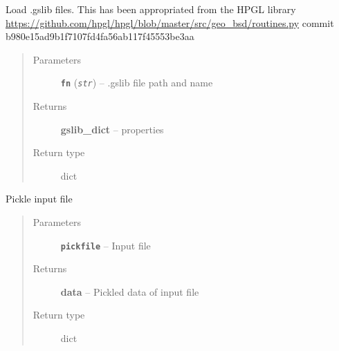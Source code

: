 \documentclass[letterpaper,10pt,english]{sphinxmanual}
\begin{document}

\begin{fulllineitems}
\label{hyvr:hyvr.hyvr.utils.load_gslib}
Load .gslib files. This has been appropriated from the HPGL library
\url{https://github.com/hpgl/hpgl/blob/master/src/geo\_bsd/routines.py}
commit b980e15ad9b1f7107fd4fa56ab117f45553be3aa
\begin{quote}\begin{description}
\item[{Parameters}] \leavevmode
\textbf{\texttt{fn}} (\emph{\texttt{str}}) -- .gslib file path and name

\item[{Returns}] \leavevmode
\textbf{gslib\_dict} -- properties

\item[{Return type}] \leavevmode
dict

\end{description}\end{quote}

\end{fulllineitems}


\begin{fulllineitems}
\label{hyvr:hyvr.hyvr.utils.load_pickle}
Pickle input file
\begin{quote}\begin{description}
\item[{Parameters}] \leavevmode
\textbf{\texttt{pickfile}} -- Input file

\item[{Returns}] \leavevmode
\textbf{data} -- Pickled data of input file

\item[{Return type}] \leavevmode
dict

\end{description}\end{quote}

\end{fulllineitems}

\end{document}
